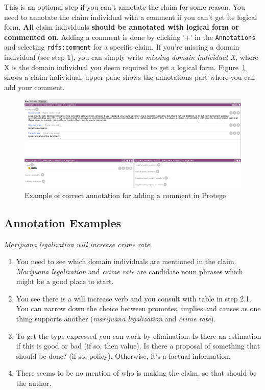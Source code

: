 This is an optional step if you can't annotate the claim for some reason. You
need to annotate the claim individual with a comment if you can't get its
logical form. \textbf{All} claim individuals \textbf{should be annotated with logical form or
commented on}. Adding a comment is done by clicking '+' in the \texttt{Annotations} and
selecting \texttt{rdfs:comment} for a specific claim. If you're missing a domain
individual (see step 1), you can simply write \textit{missing domain individual X},
where X is the domain individual you deem required to get a logical form. 
Figure~\ref{fig:comment_example} shows 
a claim individual, upper pane shows the annotations part where
you can add your comment. 

\begin{figure}
	\includegraphics[scale=0.35]{comment.png}
	\caption{Example of correct annotation for adding a comment in Protege}
	\label{fig:comment_example}
\end{figure}

\subsection*{Annotation Examples}

\begin{mydef}
 \textit{Marijuana legalization will increase crime rate. }
\end{mydef}

\begin{enumerate}[label=\textbf{Step \arabic*.}, leftmargin=2cm, itemsep=0.5cm]
\item You need to see which domain individuals are mentioned in the claim.
\textit{Marijuana legalization} and \textit{crime rate} are candidate noun phrases which
might be a good place to start. 
\item You see there is a will increase verb and you consult with table in step
2.1. You can narrow down the choice between promotes, implies and
causes as one thing supports another (\textit{marijuana legalization}
and \textit{crime rate}).  
\item To get the type expressed you can work by elimination. Is there an
estimation if this is good or bad (if so, then value). Is there a
proposal of something that should be done? (if so, policy).
		Otherwise, it’s a factual information. 
\item There seems to be no mention of who is making the claim, so that should
	be the author. 
\end{enumerate}

